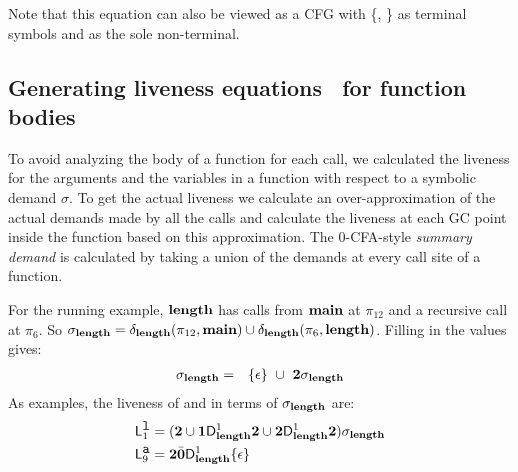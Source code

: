 \documentclass[preprint,9pt]{sigplanconf}
\begin{document}
Note that this equation can also be viewed as a CFG with \{\acdr,
\clazy\} as terminal symbols and  as the sole
non-terminal.

\subsection{Generating liveness equations \Lv\  for function bodies}
\label{sec:bodylivenessbodies}

To  avoid analyzing  the body  of a  function for  each
call, we calculated the  liveness for the arguments and
the variables in a function  with respect to a symbolic
demand  $\sigma$.   To  get   the  actual  liveness  we
calculate an  over-approximation of the  actual demands
made by  all the  calls and  calculate the  liveness at
each  GC  point  inside  the  function  based  on  this
approximation.  The 0-CFA-style {\em summary demand} is
calculated by  taking a union  of the demands  at every
call site of a function.



For  the  running  example,   $\mathbf{length}$  has  calls  from  $\mathbf{main}$  at
$\pi_{12}$ and a recursive call at $\pi_6$.
So $\sigma_{\mathbf{length}} =
     \delta_{\mathbf{length}}({\pi_{12}},{\mathbf{main}})  \cup
\delta_{\mathbf{length}}({\pi_6},{\mathbf{length}})$.
Filling in  the values gives:
\begin{eqnarray*}
\sigma_{\mathbf{length}}    &=&
 \{\epsilon\}  ~\cup~{{\mathbf{2}}\sigma_{\mathit{\mathbf{length}}}}
\end{eqnarray*}
As examples, the liveness of  and  in terms
of  $\sigma_{\mathbf{length}}$ are:
\begin{align*}
\mathsf{L}_{{1}}^{\mbox{\tt l}} &= ({\mathbf{2}} \cup \mathbf{1}\mathsf{D}_{\mathit {\mathbf{length}}}^{1}{\mathbf{2}}
  \cup {\mathbf{2}}\mathsf{D}_{\mathit {\mathbf{length}}}^{1}{{\mathbf{2}}})\sigma_{\mathit{\mathbf{length}}}
 \\
\mathsf{L}_{{9}}^{\mbox{\tt a}} &= {\mathbf{2}} \bar{\mathbf{0}} \mathsf{D}_{\mathit {\mathbf{length}}}^{1}\{\epsilon\}
\end{align*}
\end{document}
